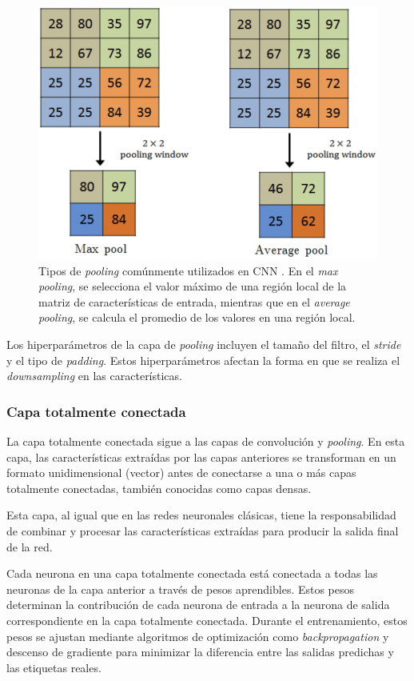 \begin{figure}[h]
	\centering
	\includegraphics[scale=0.55]{imagenes/cap2/pooling.png}
	\caption[Tipos de \textit{pooling} comunes.]{Tipos de \textit{pooling} comúnmente utilizados en CNN \cite{42}. En el \textit{max pooling}, se selecciona el valor máximo de una región local de la matriz de características de entrada, mientras que en el \textit{average pooling}, se calcula el promedio de los valores en una región local.}
	\label{fig9}
\end{figure}

Los hiperparámetros de la capa de \textit{pooling} incluyen el tamaño del filtro, el \textit{stride} y el tipo de \textit{padding}. Estos hiperparámetros afectan la forma en que se realiza el \textit{downsampling} en las características.

\subsubsection*{Capa totalmente conectada}

La capa totalmente conectada sigue a las capas de convolución y \textit{pooling}. En esta capa, las características extraídas por las capas anteriores se transforman en un formato unidimensional (vector) antes de conectarse a una o más capas totalmente conectadas, también conocidas como capas densas.

Esta capa, al igual que en las redes neuronales clásicas, tiene la responsabilidad de combinar y procesar las características extraídas para producir la salida final de la red.

Cada neurona en una capa totalmente conectada está conectada a todas las neuronas de la capa anterior a través de pesos aprendibles. Estos pesos determinan la contribución de cada neurona de entrada a la neurona de salida correspondiente en la capa totalmente conectada. Durante el entrenamiento, estos pesos se ajustan mediante algoritmos de optimización como \textit{backpropagation} y descenso de gradiente para minimizar la diferencia entre las salidas predichas y las etiquetas reales.

